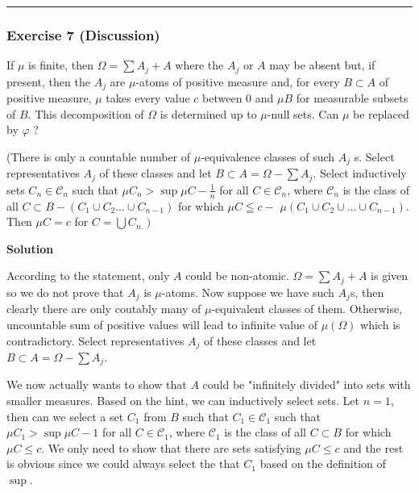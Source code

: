 \documentclass[
]{article}
\begin{document}
\begin{center}\rule{0.5\linewidth}{0.5pt}\end{center}

\hypertarget{exercise-7-discussion}{%
  \subsubsection{Exercise 7 (Discussion)}\label{exercise-7-discussion}}

If \(\mu\) is finite, then \(\Omega=\sum A_j+A\) where the \(A_j\) or
\(A\) may be absent but, if present, then the \(A_j\) are \(\mu\)-atoms
of positive measure and, for every \(B \subset A\) of positive measure,
\(\mu\) takes every value \(c\) between 0 and \(\mu B\) for measurable
subsets of \(B\). This decomposition of \(\Omega\) is determined up to
\(\mu\)-null sets. Can \(\mu\) be replaced by \(\varphi\) ?

(There is only a countable number of \(\mu\)-equivalence classes of such
\(A_j\) \textquotesingle s. Select representatives \(A_j\) of these
classes and let \(B \subset A=\Omega-\sum A_j\). Select inductively sets
\(C_n \in \mathcal{C}_n\) such that \(\mu C_n>\sup \mu C-\frac{1}{n}\)
for all \(C \in \mathcal{C}_n\), where \(\mathcal{C}_n\) is the class of
all \(C \subset B-\left(C_1 \cup C_2 \ldots \cup C_{n-1}\right)\) for
which \(\mu C \leqq c-\)
\(\mu\left(C_1 \cup C_2 \cup \ldots \cup C_{n-1}\right)\). Then
\(\mu C=c\) for \(\left.C=\bigcup C_{n .}\right)\)

\textbf{Solution}

According to the statement, only \(A\) could be non-atomic.
\(\Omega=\sum A_j+A\) is given so we do not prove that \(A_j\) is
\(\mu\)-atoms. Now suppose we have such \(A_j\)\textquotesingle s, then
clearly there are only coutably many of \(\mu\)-equivalent classes of
them. Otherwise, uncountable sum of positive values will lead to
infinite value of \(\mu(\Omega)\) which is contradictory. Select
representatives \(A_j\) of these classes and let
\(B \subset A=\Omega-\sum A_j\).

We now actually wants to show that \(A\) could be "infinitely divided"
into sets with smaller measures. Based on the hint, we can inductively
select sets. Let \(n = 1\), then can we select a set \(C_1\) from \(B\)
such that \(C_1 \in \mathcal{C}_1\) such that \(\mu C_1>\sup \mu C-1\)
for all \(C \in \mathcal{C}_1\), where \(\mathcal{C}_1\) is the class of
all \(C \subset B\) for which \(\mu C \le c\). We only need to show that
there are sets satisfying \(\mu C \le c\) and the rest is obvious since
we could always select the that \(C_1\) based on the definition of
\(\sup\).
\end{document}
